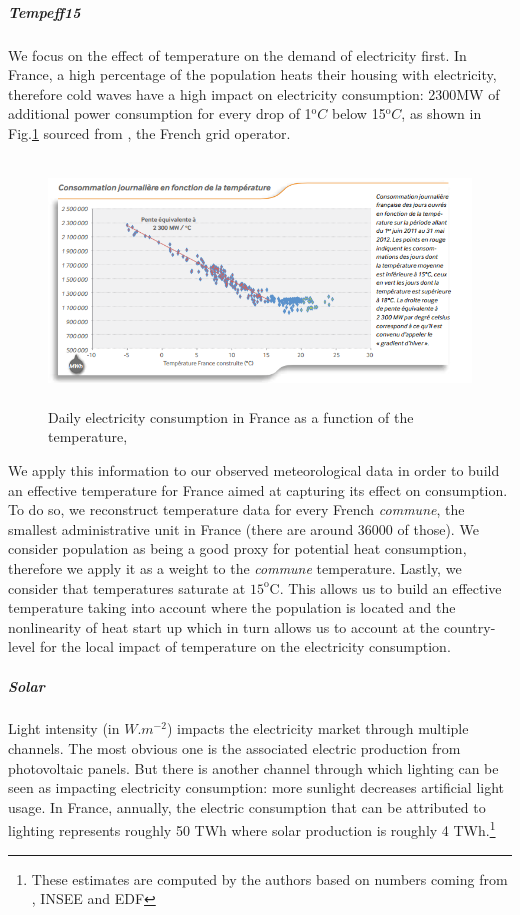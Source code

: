 \subparagraph{Tempeff15}
\label{Tempeff15}

We focus on the effect of temperature on the demand of electricity first. In France, a high percentage of the population heats their housing with electricity, therefore cold waves have a high impact on electricity consumption: 2300MW of additional power consumption for every drop of 1$^\text{o}C$ below 15$^\text{o}C$, as shown in Fig.\ref{elecconstemp} sourced from \cite{rtewebsite1}, the French grid operator. \\

\begin{figure}[!ht]
\centering
\includegraphics[height=65mm]{forqgis/Temp_Cons_France_RTE.png} 
\caption{Daily electricity consumption in France as a function of the temperature, \cite{RTEbilan2012}}
\label{elecconstemp}
\end{figure}


We apply this information to our observed meteorological data in order to build an effective temperature for France aimed at capturing its effect on consumption. To do so, we reconstruct temperature data for every French \emph{commune}, the smallest administrative unit in France (there are around 36000 of those). We consider population as being a good proxy for potential heat consumption, therefore we apply it as a weight to the \emph{commune} temperature. Lastly, we consider that temperatures saturate at $15^\text{o}$C. This allows us to build an effective temperature taking into account where the population is located and the nonlinearity of heat start up which in turn allows us to account at the country-level for the local impact of temperature on the electricity consumption.  \\

\subparagraph{Solar}
\label{Solar}
Light intensity (in $W.m^{-2}$) impacts the electricity market through multiple channels. The most obvious one is the associated electric production from photovoltaic panels. But there is another channel through which lighting can be seen as impacting electricity consumption: more sunlight decreases artificial light usage. In France, annually, the electric consumption that can be attributed to lighting represents roughly 50 TWh where solar production is roughly 4 TWh.\footnote{These estimates are computed by the authors based on numbers coming from \cite{eleceurope}, INSEE and EDF} \\

